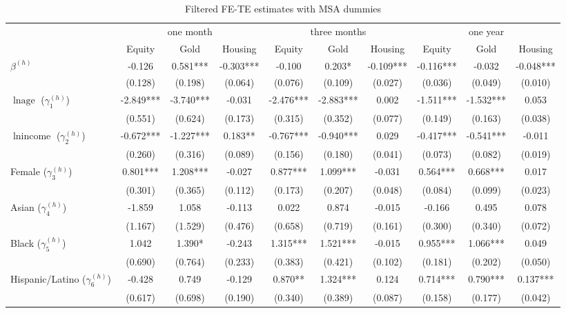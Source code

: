 \begin{table}[!h]\caption{Filtered FE-TE estimates with MSA dummies}\centering 
\begin{threeparttable} 
\begin{tabular}{|l|ccc|ccc|ccc|}\toprule 
& \multicolumn{3}{c}{one month} & \multicolumn{3}{c}{three months}&\multicolumn{3}{c}{one year}   \\  
 & Equity & Gold & Housing & Equity  & Gold & Housing & Equity & Gold & Housing \\\midrule 
$\beta^{(h)}$ & -0.126 & 0.581*** & -0.303*** & -0.100 & 0.203* & -0.109*** & -0.116*** & -0.032 & -0.048*** \\ 
 & (0.128) & (0.198) & (0.064)& (0.076) & (0.109) & (0.027)& (0.036) & (0.049) & (0.010) \\ 
$\ln \text{age}$ ($\gamma^{(h)}_1$) & -2.849*** & -3.740*** & -0.031 & -2.476*** & -2.883*** & 0.002 & -1.511*** & -1.532*** & 0.053 \\ 
 & (0.551) & (0.624) & (0.173)& (0.315) & (0.352) & (0.077)& (0.149) & (0.163) & (0.038) \\ 
$\ln \text{income}$ ($\gamma^{(h)}_2$) & -0.672*** & -1.227*** & 0.183** & -0.767*** & -0.940*** & 0.029 & -0.417*** & -0.541*** & -0.011 \\ 
 & (0.260) & (0.316) & (0.089)& (0.156) & (0.180) & (0.041)& (0.073) & (0.082) & (0.019) \\ 
Female ($\gamma^{(h)}_3$) & 0.801*** & 1.208*** & -0.027 & 0.877*** & 1.099*** & -0.031 & 0.564*** & 0.668*** & 0.017 \\ 
 & (0.301) & (0.365) & (0.112)& (0.173) & (0.207) & (0.048)& (0.084) & (0.099) & (0.023) \\ 
Asian ($\gamma^{(h)}_4$) & -1.859 & 1.058 & -0.113 & 0.022 & 0.874 & -0.015 & -0.166 & 0.495 & 0.078 \\ 
 & (1.167) & (1.529) & (0.476)& (0.658) & (0.719) & (0.161)& (0.300) & (0.340) & (0.072) \\ 
Black ($\gamma^{(h)}_5$) & 1.042 & 1.390* & -0.243 & 1.315*** & 1.521*** & -0.015 & 0.955*** & 1.066*** & 0.049 \\ 
 & (0.690) & (0.764) & (0.233)& (0.383) & (0.421) & (0.102)& (0.181) & (0.202) & (0.050) \\ 
Hispanic/Latino ($\gamma^{(h)}_6$) & -0.428 & 0.749 & -0.129 & 0.870** & 1.324*** & 0.124 & 0.714*** & 0.790*** & 0.137*** \\ 
 & (0.617) & (0.698) & (0.190)& (0.340) & (0.389) & (0.087)& (0.158) & (0.177) & (0.042) \\ 

\end{tabular}
\end{threeparttable}
\end{table}
